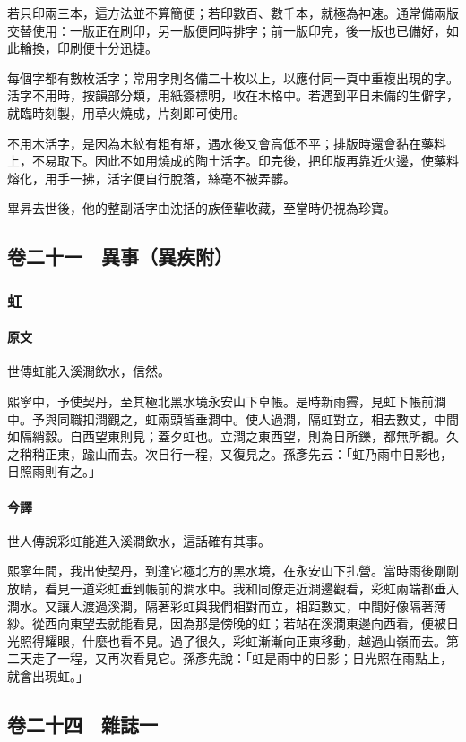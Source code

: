 若只印兩三本，這方法並不算簡便；若印數百、數千本，就極為神速。通常備兩版交替使用：一版正在刷印，另一版便同時排字；前一版印完，後一版也已備好，如此輪換，印刷便十分迅捷。

每個字都有數枚活字；常用字則各備二十枚以上，以應付同一頁中重複出現的字。活字不用時，按韻部分類，用紙簽標明，收在木格中。若遇到平日未備的生僻字，就臨時刻製，用草火燒成，片刻即可使用。

不用木活字，是因為木紋有粗有細，遇水後又會高低不平；排版時還會黏在藥料上，不易取下。因此不如用燒成的陶土活字。印完後，把印版再靠近火邊，使藥料熔化，用手一拂，活字便自行脫落，絲毫不被弄髒。

畢昇去世後，他的整副活字由沈括的族侄輩收藏，至當時仍視為珍寶。

\subsection*{卷二十一　異事（異疾附）}

\subsubsection*{虹}

\paragraph{原文}
世傳虹能入溪澗飲水，信然。

熙寧中，予使契丹，至其極北黑水境永安山下卓帳。是時新雨霽，見虹下帳前澗中。予與同職扣澗觀之，虹兩頭皆垂澗中。使人過澗，隔虹對立，相去數丈，中間如隔綃縠。自西望東則見；蓋夕虹也。立澗之東西望，則為日所鑠，都無所覩。久之稍稍正東，踰山而去。次日行一程，又復見之。孫彥先云：「虹乃雨中日影也，日照雨則有之。」

\paragraph{今譯}
世人傳說彩虹能進入溪澗飲水，這話確有其事。

熙寧年間，我出使契丹，到達它極北方的黑水境，在永安山下扎營。當時雨後剛剛放晴，看見一道彩虹垂到帳前的澗水中。我和同僚走近澗邊觀看，彩虹兩端都垂入澗水。又讓人渡過溪澗，隔著彩虹與我們相對而立，相距數丈，中間好像隔著薄紗。從西向東望去就能看見，因為那是傍晚的虹；若站在溪澗東邊向西看，便被日光照得耀眼，什麼也看不見。過了很久，彩虹漸漸向正東移動，越過山嶺而去。第二天走了一程，又再次看見它。孫彥先說：「虹是雨中的日影；日光照在雨點上，就會出現虹。」

\subsection*{卷二十四　雜誌一}

